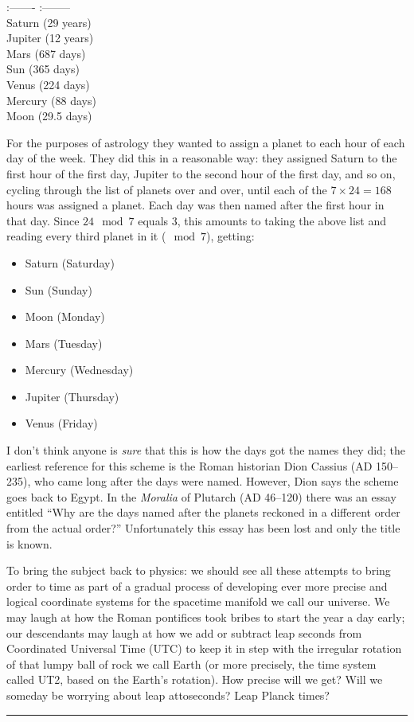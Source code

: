 \documentclass{article}
\def\tightlist{}
\begin{document}
:------- \textbar{} :-------- \textbar{}\\
Saturn \textbar{} (29 years) \textbar{}\\
Jupiter \textbar{} (12 years) \textbar{}\\
Mars \textbar{} (687 days) \textbar{}\\
Sun \textbar{} (365 days) \textbar{}\\
Venus \textbar{} (224 days) \textbar{}\\
Mercury \textbar{} (88 days) \textbar{}\\
Moon \textbar{} (29.5 days) \textbar{}

For the purposes of astrology they wanted to assign a planet to each
hour of each day of the week. They did this in a reasonable way: they
assigned Saturn to the first hour of the first day, Jupiter to the
second hour of the first day, and so on, cycling through the list of
planets over and over, until each of the \(7 \times 24 = 168\) hours was
assigned a planet. Each day was then named after the first hour in that
day. Since \(24 \mod 7\) equals \(3\), this amounts to taking the above
list and reading every third planet in it (\(\mod 7\)), getting:

\begin{itemize}
\tightlist
\item
  Saturn (Saturday)
\item
  Sun (Sunday)
\item
  Moon (Monday)
\item
  Mars (Tuesday)
\item
  Mercury (Wednesday)
\item
  Jupiter (Thursday)
\item
  Venus (Friday)
\end{itemize}

I don't think anyone is \emph{sure} that this is how the days got the
names they did; the earliest reference for this scheme is the Roman
historian Dion Cassius (AD 150--235), who came long after the days were
named. However, Dion says the scheme goes back to Egypt. In the
\emph{Moralia} of Plutarch (AD 46--120) there was an essay entitled
``Why are the days named after the planets reckoned in a different order
from the actual order?'' Unfortunately this essay has been lost and only
the title is known.

To bring the subject back to physics: we should see all these attempts
to bring order to time as part of a gradual process of developing ever
more precise and logical coordinate systems for the spacetime manifold
we call our universe. We may laugh at how the Roman pontifices took
bribes to start the year a day early; our descendants may laugh at how
we add or subtract leap seconds from Coordinated Universal Time (UTC) to
keep it in step with the irregular rotation of that lumpy ball of rock
we call Earth (or more precisely, the time system called UT2, based on
the Earth's rotation). How precise will we get? Will we someday be
worrying about leap attoseconds? Leap Planck times?

\begin{center}\rule{0.5\linewidth}{0.5pt}\end{center}
\end{document}
